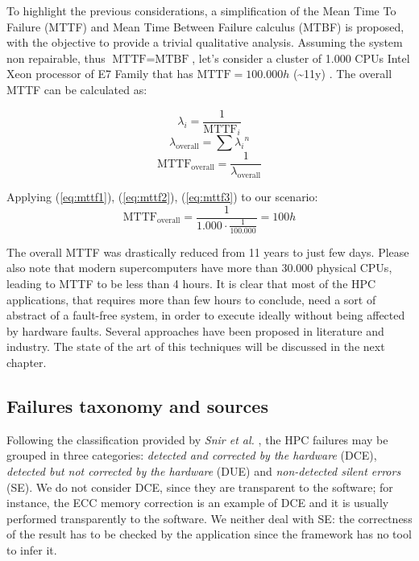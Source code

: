 To highlight the previous considerations, a simplification of
the Mean Time To Failure (MTTF) and Mean Time Between Failure calculus (MTBF)
is proposed, with the objective to provide a trivial qualitative analysis.
Assuming the system non repairable, thus \( \text{MTTF}=\text{MTBF} \),
let's consider a cluster of 1.000 CPUs Intel Xeon processor of E7 Family that has \(\text{MTTF}=100.000h\) (\textasciitilde 11y) \cite{E7Reliability}. The overall MTTF can be calculated as:

	\begin{equation}\label{eq:mttf1}
		\lambda_i = \frac{1}{\text{MTTF}_i}
	\end{equation}
	\begin{equation}\label{eq:mttf2}
		\lambda_{\text{overall}} = \sum{\lambda_i}^n
	\end{equation}
	\begin{equation}\label{eq:mttf3}
		\text{MTTF}_{\text{overall}} = \frac{1}{\lambda_{\text{overall}}}
	\end{equation}

Applying (\ref{eq:mttf1}), (\ref{eq:mttf2}), (\ref{eq:mttf3}) to our scenario:
\[  \text{MTTF}_{\text{overall}} = \frac{1}{ 1.000 \cdot \frac{1}{100.000} }
 = 100h \]

The overall MTTF was drastically reduced from 11 years to just few days.
Please also note that modern supercomputers have more than 30.000 physical
CPUs, leading to MTTF to be less than 4 hours. It is clear that most of the
HPC applications, that requires more than few hours to conclude, need a
sort of abstract of a fault-free system, in order to execute ideally without
being affected by hardware faults. Several approaches have been proposed in
literature and industry. The state of the art of this techniques will be
discussed in the next chapter.

\subsection{Failures taxonomy and sources}
Following the classification provided by \emph{Snir et al.}
\cite{snir2014addressing}, the HPC failures may be grouped in three
categories: \emph{detected and corrected by the hardware} (DCE), \emph{detected
but not corrected by the hardware} (DUE) and \emph{non-detected silent errors}
(SE).
We do not consider DCE, since they are transparent to the software; for
instance, the ECC memory correction is an example of DCE and it is usually
performed transparently to the software. We neither deal with SE: the
correctness of the result has to be checked by the application since the
framework has no tool to infer it.

